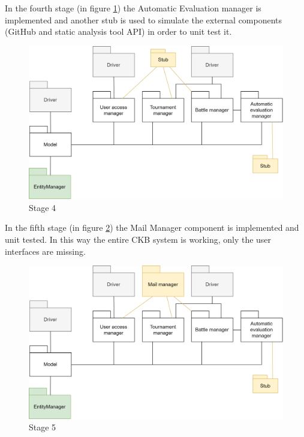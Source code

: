 In the fourth stage (in figure \ref{fig:stage4}) the Automatic Evaluation manager is implemented and another stub is used to simulate the external components (GitHub and static analysis tool API) in order to unit test it.
\begin{figure}[h]
    \centering
    \includegraphics[scale=0.7]{images/testing/stage4.png}
    \caption{Stage 4}
    \label{fig:stage4}
\end{figure}

In the fifth stage (in figure \ref{fig:stage5}) the Mail Manager component is implemented and unit tested. In this way the entire CKB system is working, only the user interfaces are missing.
\begin{figure}[h]
    \centering
    \includegraphics[scale=0.7]{images/testing/stage5.png}
    \caption{Stage 5}
    \label{fig:stage5}
\end{figure}

